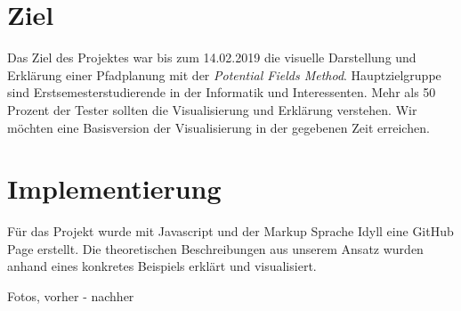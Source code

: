 

\section{Ziel}
Das Ziel des Projektes war bis zum 14.02.2019 die visuelle Darstellung und Erklärung einer Pfadplanung mit der \textit{Potential Fields Method}. Hauptzielgruppe sind Erstsemesterstudierende in der Informatik und Interessenten. Mehr als 50 Prozent der Tester sollten die Visualisierung und Erklärung verstehen. Wir möchten eine Basisversion der Visualisierung in der gegebenen Zeit erreichen.
\section{Implementierung}
Für das Projekt wurde mit Javascript und der Markup Sprache Idyll eine GitHub Page \cite{gitpage} erstellt.
Die theoretischen Beschreibungen aus unserem Ansatz wurden anhand eines konkretes Beispiels erklärt und visualisiert. 

Fotos, vorher - nachher


